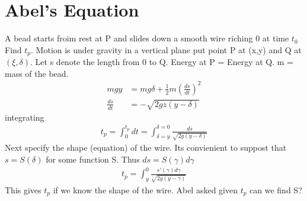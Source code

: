 \documentclass[10pt, oneside]{article}
\begin{document}
\section{Abel's Equation}
A bead starts froim rest at P and slides down a smooth wire riching 0 at time $t_{0}$ Find $t_{p}$. Motion is under gravity in a vertical plane put point P at (x,y) and Q at $(\xi,\delta)$. Let s denote the length from 0 to Q. Energy at P = Energy at Q. m = mass of the bead. 
\begin{align*}
    mgy &= mg\delta+\frac{1}{2} m (\frac{ds}{dt})^{2}\\
    \frac{ds}{dt} &= -\sqrt{2gz(y-\delta)}
\end{align*}
integrating 
\begin{align*}
    t_p = \int_{0}^{t_p}dt= \int_{\delta=y}^{\delta=0} \frac{ds}{\sqrt{2g(y-\delta)}} 
\end{align*}
Next specify the shape (equation) of the wire. Its convienient to suppost that $s=S(\delta)$ for some function S. Thus $ds = S(\gamma)d\gamma$
\begin{align*}
    t_p = \int_{y}^{0} \frac{s'(\gamma)d\gamma}{\sqrt{2g(y-\gamma)}} 
\end{align*}
This gives $t_p$ if we know the shape of the wire. Abel asked given $t_p$ can we find S? 
\end{document}
